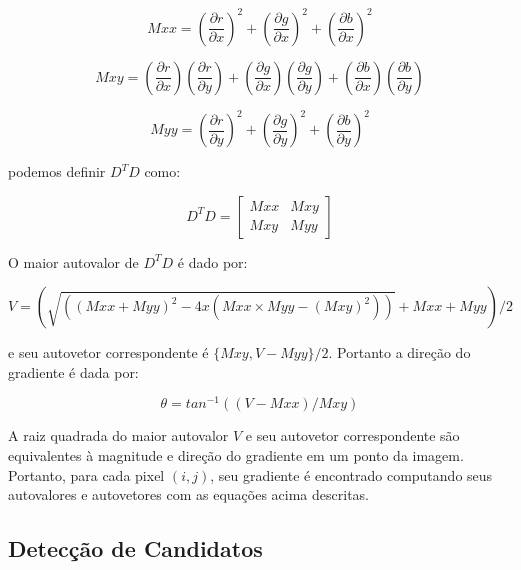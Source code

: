

$$ Mxx = (\frac{\partial r}{\partial x})^2+(\frac{\partial g}{\partial x})^2+(\frac{\partial b}{\partial x})^2 $$

$$ Mxy =(\frac{\partial r}{\partial x})(\frac{\partial r}{\partial y})+(\frac{\partial g}{\partial x})(\frac{\partial g}{\partial y})+(\frac{\partial b}{\partial x})(\frac{\partial b}{\partial y}) $$

$$ Myy = (\frac{\partial r}{\partial y})^2+(\frac{\partial g}{\partial y})^2+(\frac{\partial b}{\partial y})^2 $$

podemos definir $D^TD$ como:

$$ D^T D = \begin{bmatrix} Mxx & Mxy \\ Mxy & Myy \end{bmatrix}$$


O maior autovalor de $D^TD$ é dado por:

$$ V = (\sqrt{( (Mxx+Myy)^2 - 4 x(Mxx \times Myy - (Mxy)^2 ) )}+Mxx+ Myy)/2 $$

e seu autovetor correspondente é $ \{Mxy,V-Myy\}/2 $. Portanto a direção do gradiente é dada por:

$$ \theta = tan^{-1}((V-Mxx)/Mxy) $$

A raiz quadrada do maior autovalor $V$ e seu autovetor correspondente são equivalentes à magnitude e direção do gradiente em um ponto da imagem. Portanto, para cada pixel $(i,j)$, seu gradiente é encontrado computando seus autovalores e autovetores com as equações acima descritas.



\subsection{Detecção de Candidatos}


